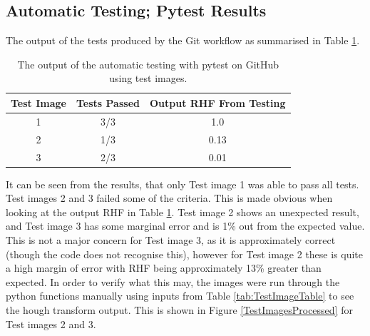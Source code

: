 \documentclass{article}
\begin{document}
\subsection{Automatic Testing; Pytest Results}
The output of the tests produced by the Git workflow as summarised in Table \ref{TestResults}.

\begin{table}[h]
    \centering
    \begin{tabular}{|c|c|c|}
    \hline
        \textbf{Test Image} & \textbf{Tests Passed} & \textbf{Output RHF From Testing}  \\
        \hline
        1 & 3/3 & 1.0 \\
        \hline
        2 & 1/3 & 0.13 \\
        \hline
        3 & 2/3 & 0.01 \\
        \hline
    \end{tabular}
    \caption{The output of the automatic testing with pytest on GitHub using test images.}
    \label{TestResults}
\end{table}

    It can be seen from the results, that only Test image 1 was able to pass all tests. Test images 2 and 3 failed some of the criteria. This is made obvious when looking at the output RHF in Table \ref{TestResults}. Test image 2 shows an unexpected result, and Test image 3 has some marginal error and is 1\% out from the expected value. This is not a major concern for Test image 3, as it is approximately correct (though the code does not recognise this), however for Test image 2 these is quite a high margin of error with RHF being approximately 13\% greater than expected. In order to verify what this may, the images were run through the python functions manually using inputs from Table \ref{tab:TestImageTable} to see the hough transform output. This is shown in Figure \ref{TestImagesProcessed} for Test images 2 and 3.
\end{document}
